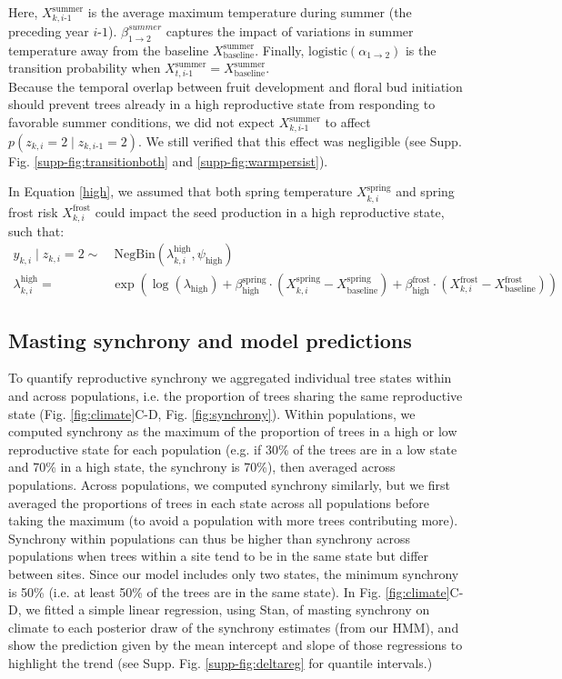 \documentclass[11pt]{article}
\begin{document}
\noindent Here, $X^\text{summer}_{k,i\text{-}1}$ is the average maximum temperature during summer (the preceding year $i\text{-}1$). $\beta^{summer}_{1 \rightarrow 2}$ captures the impact of variations in summer temperature away from the baseline $X^\text{summer}_\text{baseline}$. Finally, $\text{logistic}(\alpha_{1 \rightarrow 2})$ is the transition probability when $X^\text{summer}_{t,i\text{-}1}=X^\text{summer}_\text{baseline}$. \\
Because the temporal overlap between fruit development and floral bud initiation should prevent trees already in a high reproductive state from responding to favorable summer conditions, we did not expect $X^\text{summer}_{k,i\text{-}1}$ to affect $p(z_{k,i} = 2 \mid z_{k,i\text{-}1} = 2)$. We still verified that this effect was negligible (see Supp. Fig. \ref{supp-fig:transitionboth} and \ref{supp-fig:warmpersist}). 

In Equation \ref{high}, we assumed that both spring temperature $X^\text{spring}_{k,i}$ and spring frost risk $X^\text{frost}_{k,i}$ could impact the seed production in a high reproductive state, such that: 
\begin{align}
y_{k,i} \mid z_{k,i} = 2 \sim & ~ \text{NegBin}(\lambda^\text{high}_{k,i}, \psi_\text{high}) \\[2pt]
\lambda^\text{high}_{k,i} = & \exp \left( \log(\lambda_\text{high}) 
       + \beta_\text{high}^\text{spring} \cdot (X^\text{spring}_{k,i}-X^\text{spring}_\text{baseline})
       + \beta_\text{high}^\text{frost} \cdot (X^\text{frost}_{k,i}-X^\text{frost}_\text{baseline})\right) &
\end{align}

\subsection*{Masting synchrony and model predictions} 

To quantify reproductive synchrony we aggregated individual tree states within and across populations, i.e. the proportion of trees sharing the same reproductive state (Fig. \ref{fig:climate}C-D, Fig. \ref{fig:synchrony}). Within populations, we computed synchrony as the maximum of the proportion of trees in a high or low reproductive state  for each population (e.g. if 30\% of the trees are in a low state and 70\% in a high state, the synchrony is 70\%), then averaged across populations. Across populations, we computed synchrony similarly, but we first averaged the proportions of trees in each state across all populations before taking the maximum (to avoid a population with more trees contributing more). Synchrony within populations can thus be higher than synchrony across populations when trees within a site tend to be in the same state but differ between sites. Since our model includes only two states, the minimum synchrony is 50\% (i.e. at least 50\% of the trees are in the same state). In Fig. \ref{fig:climate}C-D, we fitted a simple linear regression, using Stan, of masting synchrony on climate to each posterior draw of the synchrony estimates (from our HMM), and show the prediction given by the mean intercept and slope of those regressions to highlight the trend (see Supp. Fig. \ref{supp-fig:deltareg} for quantile intervals.)
\end{document}
